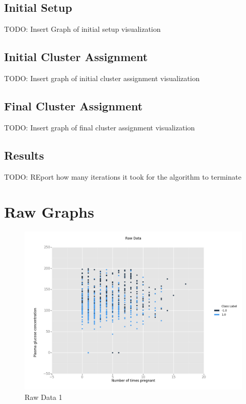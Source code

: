 \documentclass[12pt]{article}
\begin{document}
\subsection*{Initial Setup}
TODO: Insert Graph of initial setup visualization
\subsection*{Initial Cluster Assignment}
TODO: Insert graph of initial cluster assignment visualization
\subsection*{Final Cluster Assignment}
TODO: Insert graph of final cluster assignment visualization
\subsection*{Results}
TODO: REport how many iterations it took for the algorithm to terminate

\newpage
\section*{Raw Graphs}
\begin{figure}[H]
\begin{center}
\includegraphics[scale=0.66]{raw1.png}
\caption{Raw Data 1}
\label{Raw Data 1}
\end{center}
\end{figure}
\end{document}
